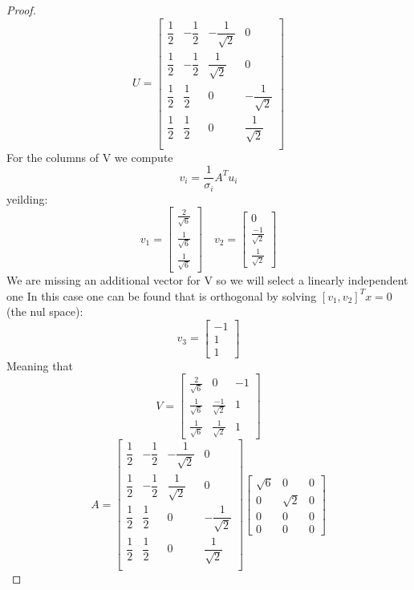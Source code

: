 \documentclass[12pt]{article}
\begin{document}
\begin{proof}
\[    U=\begin{bmatrix}
      \dfrac{1}{2}&-\dfrac{1}{2}&-\dfrac{1}{\sqrt{2}}&0\\
        \dfrac{1}{2}&-\dfrac{1}{2}&\dfrac{1}{\sqrt{2}}&0\\
          \dfrac{1}{2}&\dfrac{1}{2}&0&-\dfrac{1}{\sqrt{2}}\\
          \dfrac{1}{2}&\dfrac{1}{2}&0&\dfrac{1}{\sqrt{2}}\\
  \end{bmatrix}
  \]
  For the columns of V we compute $$v_i=\frac{1}{\sigma_i}A^Tu_i$$ yeilding:
  \[
    v_1=\begin{bmatrix}
      \frac{2}{\sqrt{6}}\\\frac{1}{\sqrt{6}}\\\frac{1}{\sqrt{6}}
  \end{bmatrix}
  \quad v_2=\begin{bmatrix}
    0\\\frac{-1}{\sqrt{2}}\\\frac{1}{\sqrt{2}}
\end{bmatrix}
  \]
  We are missing an additional vector for V so we will select a linearly independent one In this case one can be found that is orthogonal by solving $[v_1,v_2]^Tx=0$ (the nul space):
  \[
    v_3=\begin{bmatrix}
      -1\\1\\1
  \end{bmatrix}
  \]
  Meaning that
  \[
    V=\begin{bmatrix}
      \frac{2}{\sqrt{6}}&0&-1\\
      \frac{1}{\sqrt{6}}&\frac{-1}{\sqrt{2}}&1\\
      \frac{1}{\sqrt{6}}&\frac{1}{\sqrt{2}}&1
  \end{bmatrix}
  \]
  \[
    A=\begin{bmatrix}
      \dfrac{1}{2}&-\dfrac{1}{2}&-\dfrac{1}{\sqrt{2}}&0\\
        \dfrac{1}{2}&-\dfrac{1}{2}&\dfrac{1}{\sqrt{2}}&0\\
          \dfrac{1}{2}&\dfrac{1}{2}&0&-\dfrac{1}{\sqrt{2}}\\
          \dfrac{1}{2}&\dfrac{1}{2}&0&\dfrac{1}{\sqrt{2}}\\
  \end{bmatrix}\begin{bmatrix}
    \sqrt{6}&0&0\\0&\sqrt{2}&0\\0&0&0\\0&0&0

\end{bmatrix}\]
\end{proof}
\end{document}

